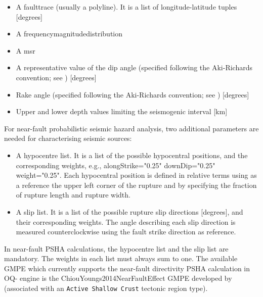 \begin{itemize}

    \item A \gls{faulttrace} (usually a polyline). It is a list of
    longitude-latitude tuples [degrees]

    \item A \gls{frequencymagnitudedistribution}

    \item A \gls{msr}

    \item A representative value of the dip angle (specified following
    the Aki-Richards convention; see \citet{aki2002}) [degrees]

    \item Rake angle (specified following the Aki-Richards convention;
    see \citet{aki2002}) [degrees]

    \item Upper and lower depth values limiting the seismogenic interval [km]

\end{itemize}

For near-fault probabilistic seismic hazard analysis, two additional
parameters are needed for characterising seismic sources:

\begin{itemize}

    \item A hypocentre list. It is a list of the possible hypocentral
    positions, and the corresponding weights, e.g., alongStrike="0.25"
    downDip="0.25" weight="0.25". Each hypocentral position is defined in
    relative terms using as a reference the upper left corner of the rupture
    and by specifying the fraction of rupture length and rupture width.

    \item A slip list. It is a list of the possible rupture slip directions
    [degrees], and their corresponding weights. The angle describing each slip
    direction is measured counterclockwise using the fault strike direction as
    reference.

\end{itemize}

In near-fault PSHA calculations, the hypocentre list and the slip list are
mandatory. The weights in each list must always sum to one. The available GMPE
which currently supports the near-fault directivity PSHA calculation in OQ-
engine is the ChiouYoungs2014NearFaultEffect GMPE developed  by
\citet{chiou2014update} (associated with an \texttt{Active Shallow Crust}
tectonic region type).

